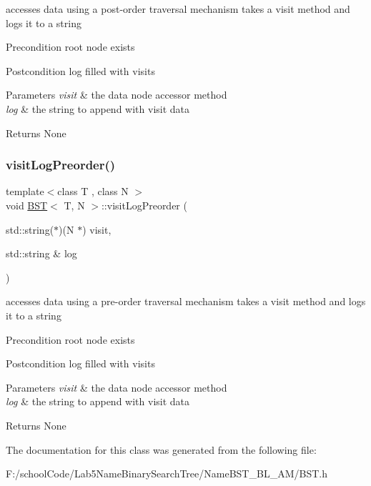 accesses data using a post-\/order traversal mechanism takes a visit method and logs it to a string \begin{DoxyPrecond}{Precondition}
root node exists 
\end{DoxyPrecond}
\begin{DoxyPostcond}{Postcondition}
log filled with visits 
\end{DoxyPostcond}

\begin{DoxyParams}{Parameters}
{\em visit} & the data node accessor method \\
\hline
{\em log} & the string to append with visit data \\
\hline
\end{DoxyParams}
\begin{DoxyReturn}{Returns}
None 
\end{DoxyReturn}
\mbox{\label{class_b_s_t_a7ed3924d6f70e52c7a6bc1d5bddbb31d}} 
\subsubsection{\texorpdfstring{visit\+Log\+Preorder()}{visitLogPreorder()}}
{\footnotesize\ttfamily template$<$class T , class N $>$ \\
void \hyperlink{class_b_s_t}{B\+ST}$<$ T, N $>$\+::visit\+Log\+Preorder (\begin{DoxyParamCaption}\item[{std\+::string($\ast$)(N $\ast$)}]{visit,  }\item[{std\+::string \&}]{log }\end{DoxyParamCaption})}

accesses data using a pre-\/order traversal mechanism takes a visit method and logs it to a string \begin{DoxyPrecond}{Precondition}
root node exists 
\end{DoxyPrecond}
\begin{DoxyPostcond}{Postcondition}
log filled with visits 
\end{DoxyPostcond}

\begin{DoxyParams}{Parameters}
{\em visit} & the data node accessor method \\
\hline
{\em log} & the string to append with visit data \\
\hline
\end{DoxyParams}
\begin{DoxyReturn}{Returns}
None 
\end{DoxyReturn}


The documentation for this class was generated from the following file\+:\begin{DoxyCompactItemize}
\item 
F\+:/school\+Code/\+Lab5\+Name\+Binary\+Search\+Tree/\+Name\+B\+S\+T\+\_\+\+B\+L\+\_\+\+A\+M/B\+S\+T.\+h\end{DoxyCompactItemize}
